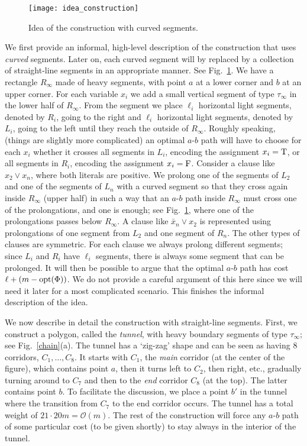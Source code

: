 \documentclass[11pt,a4paper]{article}
\def\true{{\rm T}}
\def\false{{\rm F}}
\begin{document}
\begin{figure}
\centering
\texttt{[image: idea\_construction]}
\caption{Idea of the construction with curved segments.}
\label{idea}
\end{figure}

We first provide an informal, high-level description of the construction that uses \emph{curved} segments. Later on, each curved segment will by replaced by a collection of straight-line segments in an appropriate manner. See Fig.~\ref{idea}. We have a rectangle $R_\infty$ made of heavy segments, with point $a$ at a lower corner and $b$ at an upper corner. For each variable $x_i$ we add a small vertical segment of type $\tau_{\infty}$ in the lower half of $R_\infty$.
From the segment we place $\ell_i$ horizontal light segments, denoted by $R_i$, going to the right and $\ell_i$ horizontal light segments, denoted by $L_i$, going to the left until they reach the outside of $R_{\infty}$. Roughly speaking, (things are slightly more complicated)
an optimal $a$-$b$ path will have to choose for each $x_i$ whether it crosses all segments in $L_i$, encoding the assignment $x_i=\true$, or all segments in $R_i$, encoding the assignment $x_i=\false$.
Consider a clause like $x_2\vee x_{n}$, where both literals are positive.  We prolong one of the segments of $L_2$ and one of the segments of $L_n$ with a curved segment so that they cross again inside $R_\infty$ (upper half) in such a way that an $a$-$b$ path inside $R_\infty$ must cross one of the prolongations, and one is enough; see Fig.~\ref{idea}, where one of the prolongations passes below $R_\infty$. A clause like $\bar x_n\vee x_2$ is represented using prolongations of one segment from $L_2$ and one segment of $R_n$. The other types of clauses are symmetric. For each clause we always prolong different segments; since $L_i$ and $R_i$ have $\ell_i$ segments, there is always some segment that can be prolonged. It will then be possible to argue that the optimal $a$-$b$ path has cost $\ell+ (m-{\rm opt}(\Phi))$. 
We do not provide a careful argument of this here since we will need it later for a most complicated scenario. This finishes the informal description of the idea.

We now describe in detail the construction with straight-line segments.
First, we construct a polygon, called the \emph{tunnel}, with heavy boundary segments of type $\tau_{\infty}$; see Fig.~\ref{chain}(a).  
The tunnel has a `zig-zag' shape and can be seen as having $8$ corridors, $C_1,\ldots ,C_8$. It starts with $C_1$,  the \emph{main} corridor (at the center of the figure), which contains point $a$, then it turns left to  $C_2$, then right, etc., gradually turning around to $C_7$ and then to the \emph{end} corridor $C_8$ (at the top). The latter contains point $b$. To facilitate the discussion, we place a point $b'$ in the tunnel where the transition from $C_7$ to the end corridor occurs. 
The tunnel has a total weight of $21\cdot 20m =\mathcal{O}(m)$.
The rest of the construction will force any $a$-$b$ path of some particular cost (to be given shortly) to stay always in the interior of the tunnel. 
\end{document}
